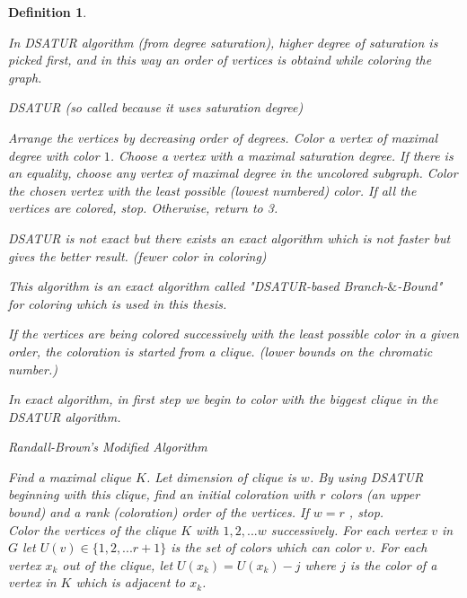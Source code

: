 \documentclass[12pt]{article}
\theoremstyle{slplain}
\newtheorem{defi}{Definition}
\begin{document}
\begin{defi}
\begin{enumerate}
In DSATUR algorithm (from degree saturation), higher degree of saturation is picked first, and in this way an order of vertices is obtaind while coloring the graph.

\vspace{1cm}

\begin{algorithm}[H]
\SetAlgoLined
\DontPrintSemicolon
  \caption{DSATUR (so called because it uses saturation degree)\cite{brelaz}}

  Arrange the vertices by decreasing order of degrees.\;
   Color a vertex of maximal degree with color $1$.\;
  Choose a vertex with a maximal saturation degree. If there is an
equality, choose any vertex of maximal degree in the uncolored
subgraph.\;
    Color the chosen vertex with the least possible (lowest numbered)
color.\;
  If all the vertices are colored, stop. Otherwise, return to 3.\;
 
\end{algorithm}

\newpage

DSATUR is not exact but there exists an exact algorithm which is not faster but gives the better 
result. (fewer color in coloring)

This algorithm is an exact algorithm called "DSATUR-based Branch-$\&$-Bound" for coloring which is used in this thesis.

If the vertices are being colored successively with the least possible color in a
given order, the coloration is started from a clique. (lower bounds on the 
chromatic number.)

In exact algorithm, in first step we begin to color with the biggest clique in the DSATUR algorithm.



\newpage
{}
\begin{algorithm}[H]
\SetAlgoLined
\DontPrintSemicolon
  \caption{Randall-Brown's Modified Algorithm\cite{randall}}
  
{\small  Find a maximal clique $K$. Let dimension of clique is $w$. By using DSATUR
beginning with this clique, find an initial coloration with $r$ colors (an
upper bound) and a rank (coloration) order of the vertices. If $w = r$ , stop.\\

 Color the vertices of the clique $K$ with $1, 2, . . . w$ successively. For each
vertex $v$ in $G$ let $U(v) \in \{1, 2, . . . r + 1\}$ is the set of colors which can color
$v$. For each vertex $x_k$ out of the clique, let $U(x_k) = U(x_k) - j$ where $j$ is
the color of a vertex in $K$ which is adjacent to $x_k$.\\

}
\end{algorithm}
\end{enumerate}
\end{defi}
\end{document}
